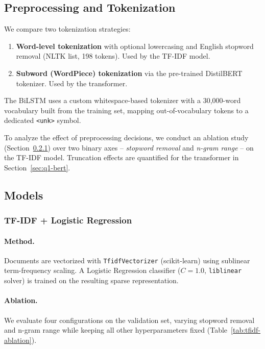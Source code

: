 \documentclass[11pt,a4paper]{article}
\begin{document}
\subsection{Preprocessing and Tokenization}

We compare two tokenization strategies:
\begin{enumerate}[noitemsep]
    \item \textbf{Word-level tokenization} with optional lowercasing and English stopword removal (NLTK list, 198 tokens). Used by the TF-IDF model.
    \item \textbf{Subword (WordPiece) tokenization} via the pre-trained DistilBERT tokenizer. Used by the transformer.
\end{enumerate}
The BiLSTM uses a custom whitespace-based tokenizer with a 30{,}000-word vocabulary built from the training set, mapping out-of-vocabulary tokens to a dedicated \texttt{<unk>} symbol.

To analyze the effect of preprocessing decisions, we conduct an ablation study (Section~\ref{sec:q1-tfidf}) over two binary axes -- \emph{stopword removal} and \emph{n-gram range} -- on the TF-IDF model. Truncation effects are quantified for the transformer in Section~\ref{sec:q1-bert}.

\subsection{Models}

\subsubsection{TF-IDF + Logistic Regression}
\label{sec:q1-tfidf}

\paragraph{Method.} Documents are vectorized with \texttt{TfidfVectorizer} (scikit-learn) using sublinear term-frequency scaling. A Logistic Regression classifier ($C=1.0$, \texttt{liblinear} solver) is trained on the resulting sparse representation.

\paragraph{Ablation.} We evaluate four configurations on the validation set, varying stopword removal and n-gram range while keeping all other hyperparameters fixed (Table~\ref{tab:tfidf-ablation}).
\end{document}
